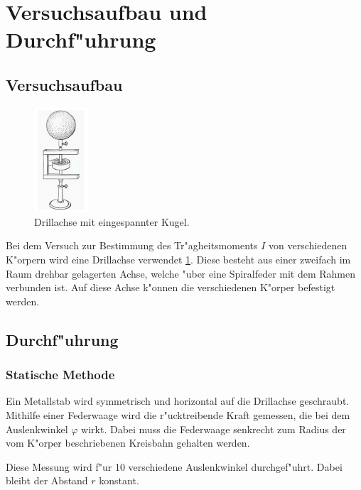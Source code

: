 \section{Versuchsaufbau und Durchf"uhrung} %
\label{sec:durchf_uhrung}

\subsection{Versuchsaufbau} %
\label{sub:aufbau}

\begin{figure}[!h]
	\centering
	\includegraphics[width = 2cm]{img/Drillachse.PNG}
	\caption{Drillachse mit eingespannter Kugel. \cite{anleitung}}
	\label{drillachse}
\end{figure}

Bei dem Versuch zur Bestimmung des Tr"agheitsmoments $I$ von verschiedenen K"orpern wird eine Drillachse verwendet \ref{drillachse}. Diese besteht aus einer zweifach im Raum drehbar gelagerten Achse, welche "uber eine Spiralfeder mit dem Rahmen verbunden ist.
Auf diese Achse k"onnen die verschiedenen K"orper befestigt werden.

\subsection{Durchf"uhrung} %
\label{sub:durchf_uhrung}

\subsubsection{Statische Methode} %
\label{sub:statische_methode}

Ein Metallstab wird symmetrisch und horizontal auf die Drillachse geschraubt. 
Mithilfe einer Federwaage wird die r"ucktreibende Kraft gemessen, die bei dem Auslenkwinkel $\varphi$ wirkt.
Dabei muss die Federwaage senkrecht zum Radius der vom K"orper beschriebenen Kreisbahn gehalten werden.

Diese Messung wird f"ur 10 verschiedene Auslenkwinkel durchgef"uhrt.
Dabei bleibt der Abstand $r$ konstant.

